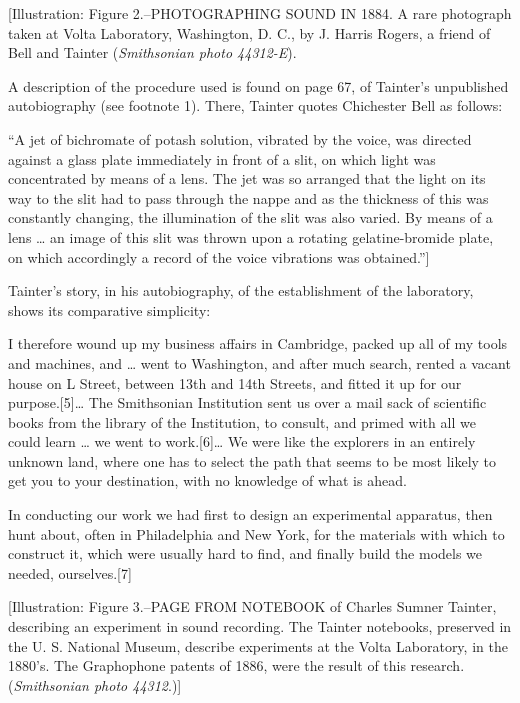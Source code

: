 \documentclass[12pt,oneside]{scrbook}
\begin{document}
  {[}Illustration: Figure 2.--PHOTOGRAPHING SOUND IN 1884. A rare
  photograph taken at Volta Laboratory, Washington, D. C., by J. Harris
  Rogers, a friend of Bell and Tainter (\emph{Smithsonian photo 44312-E}).
  
  A description of the procedure used is found on page 67, of Tainter's
  unpublished autobiography (see footnote 1). There, Tainter quotes
  Chichester Bell as follows:
  
  ``A jet of bichromate of potash solution, vibrated by the voice, was
  directed against a glass plate immediately in front of a slit, on which
  light was concentrated by means of a lens. The jet was so arranged that
  the light on its way to the slit had to pass through the nappe and as
  the thickness of this was constantly changing, the illumination of the
  slit was also varied. By means of a lens \ldots{} an image of this slit
  was thrown upon a rotating gelatine-bromide plate, on which accordingly
  a record of the voice vibrations was obtained.''{]}
  
  Tainter's story, in his autobiography, of the establishment of the
  laboratory, shows its comparative simplicity:
  
  I therefore wound up my business affairs in Cambridge, packed up all of
  my tools and machines, and \ldots{} went to Washington, and after much
  search, rented a vacant house on L Street, between 13th and 14th
  Streets, and fitted it up for our purpose.{[}5{]}\ldots{} The
  Smithsonian Institution sent us over a mail sack of scientific books
  from the library of the Institution, to consult, and primed with all we
  could learn \ldots{} we went to work.{[}6{]}\ldots{} We were like the
  explorers in an entirely unknown land, where one has to select the path
  that seems to be most likely to get you to your destination, with no
  knowledge of what is ahead.
  
  In conducting our work we had first to design an experimental apparatus,
  then hunt about, often in Philadelphia and New York, for the materials
  with which to construct it, which were usually hard to find, and finally
  build the models we needed, ourselves.{[}7{]}
  
  {[}Illustration: Figure 3.--PAGE FROM NOTEBOOK of Charles Sumner
  Tainter, describing an experiment in sound recording. The Tainter
  notebooks, preserved in the U. S. National Museum, describe experiments
  at the Volta Laboratory, in the 1880's. The Graphophone patents of 1886,
  were the result of this research. (\emph{Smithsonian photo 44312}.){]}
  
\end{document}
